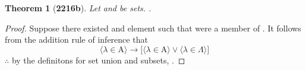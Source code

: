 \documentclass[preview]{standalone}
\newtheorem{theorem}{Theorem}
\begin{document}
\begin{theorem}[\textbf{2216b}]
    Let  and \bm{$\Lambda$} be sets. 
    .
\end{theorem}
\begin{proof}
    Suppose there existed and element \bm{$\lambda$} such that 
    \bm{$\lambda$} were a member of .
    It follows from the addition rule of inference that
    \begin{equation*}
        \Big \langle \lambda \in \mathrm{A} \Big \rangle
            \rightarrow
        \bigg[ 
            \Big \langle \lambda \in \mathrm{A} \Big \rangle
                \lor 
            \Big \langle \lambda \in \Lambda \Big \rangle
        \bigg]
    \end{equation*}
    $\therefore$ by the definitons for set union and subsets,
    .
\end{proof}
\end{document}
